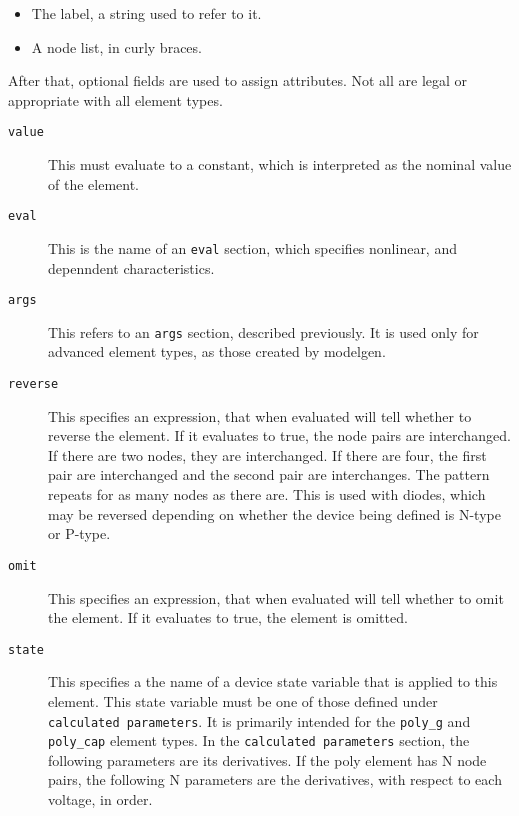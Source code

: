 \begin{enumerate}
\begin{itemize}
\item
The label, a string used to refer to it.

\item
A node list, in curly braces.

\end{itemize}

After that, optional fields are used to assign attributes.  Not all
are legal or appropriate with all element types.

\begin{description}

\item[{\tt value}]
This must evaluate to a constant, which is interpreted as the nominal
value of the element.

\item[{\tt eval}]
This is the name of an {\tt eval} section, which specifies nonlinear,
and depenndent characteristics.

\item[{\tt args}]
This refers to an {\tt args} section, described previously.  It is
used only for advanced element types, as those created by modelgen.

\item[{\tt reverse}]
This specifies an expression, that when evaluated will tell whether to
reverse the element.  If it evaluates to true, the node pairs are
interchanged.  If there are two nodes, they are interchanged.  If
there are four, the first pair are interchanged and the second pair
are interchanges.  The pattern repeats for as many nodes as there are.
This is used with diodes, which may be reversed depending on whether
the device being defined is N-type or P-type.

\item[{\tt omit}]
This specifies an expression, that when evaluated will tell whether to
omit the element.  If it evaluates to true, the element is omitted.

\item[{\tt state}]
This specifies a the name of a device state variable that is applied
to this element.  This state variable must be one of those defined
under {\tt calculated parameters}.  It is primarily intended for the
{\tt poly\_g} and {\tt poly\_cap} element types.  In the {\tt calculated
parameters} section, the following parameters are its derivatives.  If
the poly element has N node pairs, the following N parameters are the
derivatives, with respect to each voltage, in order.

\end{description}

\end{enumerate}
